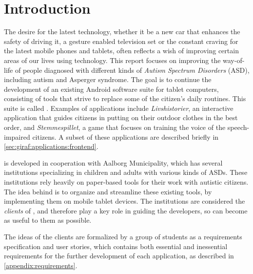 \newcommand{\headerIntroduction}{Introduction}
\chapter*{\headerIntroduction}\label{chap:introduction}
\addcontentsline{toc}{chapter}{\headerIntroduction}

The desire for the latest technology, whether it be a new car that enhances the safety of driving it, a gesture enabled television set or the constant craving for the latest mobile phones and tablets, often reflects a wish of improving certain areas of our lives using technology.
This report focuses on improving the way-of-life of people diagnosed with different kinds of \textit{Autism Spectrum Disorders} (ASD), including autism and Asperger syndrome.
The goal is to continue the development of an existing Android software suite for tablet computers, consisting of tools that strive to replace some of the citizen's daily routines. 
This suite is called \giraf.
Examples of \giraf applications include \textit{Livshistorier}, an interactive application that guides citizens in putting on their outdoor clothes in the best order, and \textit{Stemmespillet}, a game that focuses on training the voice of the speech-impaired citizens.
A subset of these applications are described briefly in \cref{sec:giraf:applications:frontend}.

\giraf is developed in cooperation with Aalborg Municipality, which has several institutions specializing in children and adults with various kinds of ASDs.
These institutions rely heavily on paper-based tools for their work with autistic citizens.
The idea behind \giraf is to organize and streamline these existing tools, by implementing them on mobile tablet devices.
The institutions are considered the \textit{clients} of \giraf, and therefore play a key role in guiding the developers, so \giraf can become as useful to them as possible.

The ideas of the clients are formalized by a group of students as a requirements specification and user stories, which contains both essential and inessential requirements for the further development of each application, as described in \cref{appendix:requirements}.